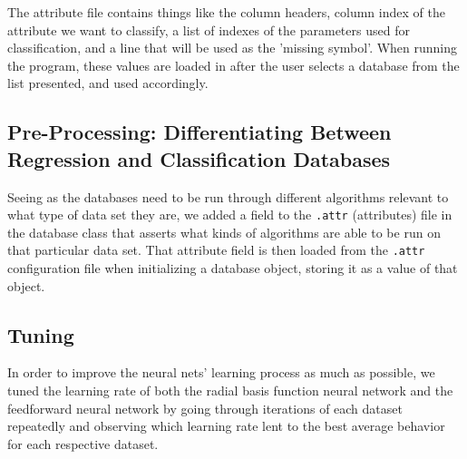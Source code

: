 \documentclass[twoside,11pt]{article}
\begin{document}
The attribute file contains things like the column headers, column index of the attribute we want to classify, a list of indexes of the parameters used for classification, and a line that will be used as the 'missing symbol'. When running the program, these values are loaded in after the user selects a database from the list presented, and used accordingly.

\subsection{Pre-Processing: Differentiating Between Regression and Classification Databases}
Seeing as the databases need to be run through different algorithms relevant to what type of data set they are, we added a field to the \texttt{.attr} (attributes) file in the database class that asserts what kinds of algorithms are able to be run on that particular data set. That attribute field is then loaded from the \texttt{.attr} configuration file when initializing a database object, storing it as a value of that object.


\subsection{Tuning}
In order to improve the neural nets' learning process as much as possible, we tuned the learning rate of both the radial basis function neural network and the feedforward neural network by going through iterations of each dataset repeatedly and observing which learning rate lent to the best average behavior for each respective dataset.

\end{document}
